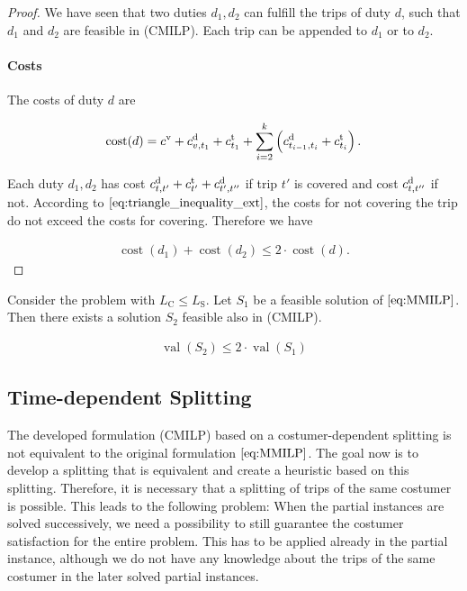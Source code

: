 \begin{proof}
We have seen that two duties $d_1,d_2$ can fulfill the trips of duty $d$, such that $d_1$ and $d_2$ are feasible in (CMILP). Each trip can be appended to $d_1$ or to $d_2$.

\paragraph{Costs}

The costs of duty $d$ are

\begin{align*}
	\operatorname{cost}(d)=c^{\operatorname{v}}+c^{\operatorname{d}}_{v,t_1}+c^{\operatorname{t}}_{t_1}+\sum_{i=2}^k \left(c^{\operatorname{d}}_{t_{i-1},t_i}+c^{\operatorname{t}}_{t_i}\right).
\end{align*}

Each duty $d_1,d_2$ has cost $c^{\operatorname{d}}_{t,t'}+c^{\operatorname{t}}_{t'}+c^{\operatorname{d}}_{t',t''}$ if trip $t'$ is covered and cost $c^{\operatorname{d}}_{t,t''}$ if not. According to $\eqref{eq:triangle_inequality_ext}$, the costs for not covering the trip do not exceed the costs for covering. Therefore we have

\begin{align*}
	\operatorname{cost}\left(d_1\right)+\operatorname{cost}\left(d_2\right)\leq 2\cdot\operatorname{cost}\left(d\right).
\end{align*}

\end{proof}

\begin{corollary}

Consider the problem with $L_{\operatorname{C}}\leq L_{\operatorname{S}}$. Let $S_1$ be a feasible solution of $\eqref{eq:MMILP}$. Then there exists a solution $S_2$ feasible also in (CMILP).

\begin{align*}
	\operatorname{val}\left(S_2\right)\leq 2\cdot\operatorname{val}\left(S_1\right)
\end{align*}

\end{corollary}


\subsection{Time-dependent Splitting}

The developed formulation (CMILP) based on a costumer-dependent splitting is not equivalent to the original formulation $\eqref{eq:MMILP}$. The goal now is to develop a splitting that is equivalent and create a heuristic based on this splitting. Therefore, it is necessary that a splitting of trips of the same costumer is possible. This leads to the following problem: When the partial instances are solved successively, we need a possibility to still guarantee the costumer satisfaction for the entire problem. This has to be applied already in the partial instance, although we do not have any knowledge about the trips of the same costumer in the later solved partial instances.

